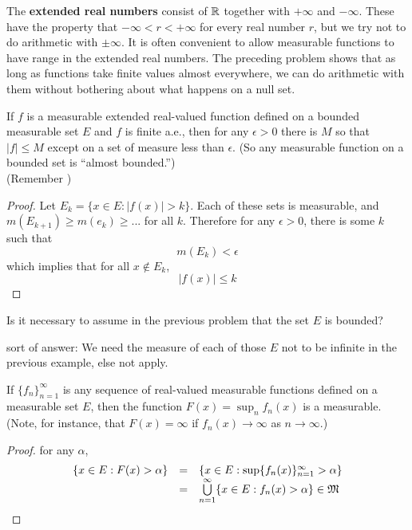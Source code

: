 \begin{defn}\label{d:extendedreals}%
	The \textbf{extended real numbers} consist of $\mathbb{R}$ together with $+\infty$ 
	and $-\infty$. These have the property that $-\infty < r < +\infty$ for 
	every real number $r$, but we try not to do arithmetic with $\pm\infty$. It 
	is often convenient to allow measurable functions to have range in the 
	extended real numbers. The preceding problem shows that as long as 
	functions take finite values almost everywhere, we can do arithmetic with 
	them without bothering about what happens on a null set. 
\end{defn}

\begin{pblm}%
	If $f$ is a measurable extended real-valued function defined on a bounded 
	measurable set $E$ and $f$ is finite a.e., then for any $\epsilon > 0$ 
	there is $M$ so that $|f| \le M$ except on a set of measure less than 
	$\epsilon$. (So any measurable function on a bounded set is ``almost 
	bounded.'') \\ (Remember )
\begin{proof}
	Let $E_k = \{x \in E: |f(x)| > k\}$. Each of these sets is 
	measurable, and $m(E_{k+1}) \ge m(e_k) \ge ...$ for all $k$. Therefore 
	for any $\epsilon > 0$, there is some $k$ such that 
	\begin{equation*}
		m(E_k) < \epsilon
	\end{equation*}
	which implies that for all $x \notin E_k$, 
	\begin{equation*}
		|f(x)| \le k
	\end{equation*}
\end{proof}
\end{pblm}

\begin{pblm}%
	Is it necessary to assume in the previous problem that the set $E$ is 
	bounded? 

	sort of answer: We need the measure of each of those $E$ not to be infinite 
	in the previous example, else   not apply. 
\end{pblm}

\begin{pblm}%
	If $\{f_n\}_{n=1}^\infty$ is any sequence of real-valued measurable 
	functions defined on a measurable set $E$, then the function 
	$F(x) = \sup_n f_n(x)$ is a measurable. (Note, for instance, that 
	$F(x) = \infty$ if $f_n(x) \rightarrow \infty$ as $n \rightarrow \infty$.)
\begin{proof}
	for any $\alpha$, 
	\begin{equation*}
	\begin{array}{rcl}
		\{x \in E: F(x) > \alpha\} &=& \{x \in E: \sup \{f_n(x)\}_{n=1}^\infty > \alpha\}\\
		&=& \bigcup\limits_{n=1}^\infty\{x\in E: f_n(x) > \alpha\} \in \mathfrak{M}
	\end{array}
	\end{equation*}
\end{proof}
\end{pblm}

